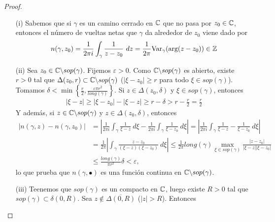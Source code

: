 \begin{proof}
    \begin{enumerate}
        \item[(i)] Sabemos que si $\gamma$ es un camino cerrado en $\mathbb{C}$ que no pasa por $z_0 \in \mathbb{C}$, entonces el número de vueltas netas que $\gamma$ da alrededor de $z_0$ viene dado por
              \begin{align*}
                  n(\gamma,z_0) = \frac{1}{2\pi i}\int_{\gamma}{\frac{1}{z-z_0} \ dz} = \frac{1}{2\pi}\text{Var}_{\gamma}(\text{arg}(z-z_0)) \in \mathbb{Z}
              \end{align*}
        \item[(ii)] Sea $z_0 \in \mathbb{C} \backslash sop(\gamma)$. Fijemos $\varepsilon > 0$. Como $\mathbb{C} \backslash sop(\gamma)$ es abierto, existe $r > 0$ tal que $\Delta(z_0,r) \subset \mathbb{C} \backslash sop(\gamma)$ ($|\xi - z_0| \ge r$ para todo $\xi \in sop(\gamma)$). Tomamos $\delta < \min\left\{ \frac{r}{2}, \frac{\varepsilon \pi r^2}{long(\gamma)}\right\}$. Si $z \in \Delta(z_0,\delta)$ y $\xi \in sop(\gamma)$, entonces
              \begin{align*}
                  |\xi - z| \ge |\xi - z_0| - |\xi - z| \ge r - \delta > r - \frac{r}{2} = \frac{r}{2}
              \end{align*}
              Y además, si $z \in \mathbb{C} \backslash sop(\gamma)$ y $z \in \Delta(z_0,\delta)$, entonces
              \begin{align*}
                  |n(\gamma,z) - n(\gamma,z_0)| & = \left| \frac{1}{2\pi i}\int_{\gamma}{\frac{1}{\xi - z} \ d\xi} - \frac{1}{2\pi i}\int_{\gamma}{\frac{1}{\xi - z_0} \ d\xi} \right| = \left| \frac{1}{2\pi i}\int_{\gamma}{\frac{1}{\xi - z} - \frac{1}{\xi - z_0} \ d\xi}  \right| \\
                                                & = \frac{1}{2\pi}\left| \int_{\gamma}{\frac{z - z_0}{(\xi - z)(\xi - z_0)} \ d\xi}\right| \leq \frac{1}{2\pi} long(\gamma) \max_{\xi \in sop(\gamma)}\frac{|z-z_0|}{|\xi -z||\xi - z_0|}                                              \\
                                                & \leq \frac{long(\gamma)}{\pi r^2}\delta < \varepsilon,
              \end{align*}
              lo que prueba que $n(\gamma, \bullet)$ es una función continua en $\mathbb{C} \backslash sop(\gamma)$.
        \item[(iii)] Teenemos que $sop(\gamma)$ es un compacto en $\mathbb{C}$, luego existe $R > 0$ tal que $sop(\gamma) \subset \delta(0,R)$. Sea $z \not \in \overline{\Delta(0,R)}$ ($|z| > R$). Entonces

\end{enumerate}
\end{proof}
